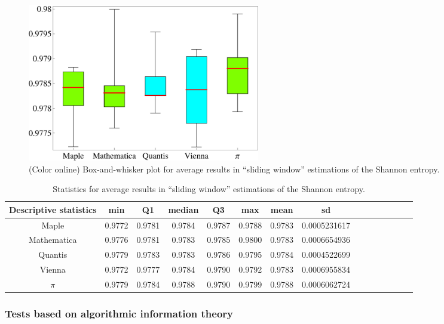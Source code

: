 \documentclass[10pt]{article}%
\begin{document}
\begin{figure}[htbp] %
   \centering
   \includegraphics[width=4in]{2009-QvPR-boxLentropy}
   \caption{(Color online) Box-and-whisker plot for average results in ``sliding window'' estimations of the Shannon entropy.}
   \label{fig:example2}
\end{figure}


\begin{table}
\caption{Statistics for average results in ``sliding window''
estimations of the Shannon entropy.}\label{tab:2}
\begin{center}
\begin{tabular}
[c]{c c c c c c c c c c c c c c c }%
\hline\hline
Descriptive statistics & min & Q1 & median & Q3 & max & mean & sd\\\hline
Maple & 0.9772 & 0.9781 & 0.9784 & 0.9787 & 0.9788 & 0.9783 & 0.0005231617\\
Mathematica & 0.9776 & 0.9781 & 0.9783 & 0.9785 & 0.9800 & 0.9783 & 0.0006654936\\
Quantis & 0.9779 & 0.9783 & 0.9783 & 0.9786 & 0.9795 & 0.9784 & 0.0004522699\\
Vienna & 0.9772 & 0.9777 & 0.9784 & 0.9790 & 0.9792 & 0.9783 & 0.0006955834\\
$\pi$ & 0.9779 & 0.9784 & 0.9788 & 0.9790 & 0.9799 & 0.9788 & 0.0006062724\\\hline\hline
\end{tabular}
\end{center}
\end{table}

\subsubsection{Tests based on algorithmic information theory}
\end{document}

